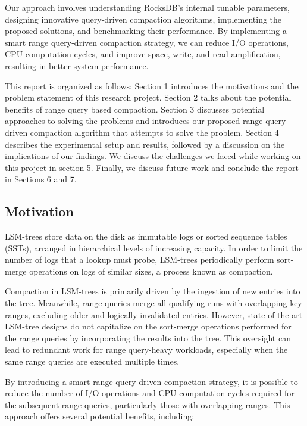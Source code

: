 \documentclass[balance=false, sigconf]{acmart}
\begin{document}
Our approach involves understanding RocksDB's\cite{rocksdb} internal tunable parameters, designing innovative query-driven compaction algorithms, implementing the proposed solutions, and benchmarking their performance. By implementing a smart range query-driven compaction strategy, we can reduce I/O operations, CPU computation cycles, and improve space, write, and read amplification, resulting in better system performance.

This report is organized as follows: Section 1 introduces the motivations and the problem statement of this research project. Section 2 talks about the potential benefits of range query based compaction. Section 3 discusses potential approaches to solving the problems and introduces our proposed range query-driven compaction algorithm that attempts to solve the problem. Section 4 describes the experimental setup and results, followed by a discussion on the implications of our findings. We discuss the challenges we faced while working on this project in section 5. Finally, we discuss future work and conclude the report in Sections 6 and 7.


\subsection{Motivation}

LSM-trees store data on the disk as immutable logs or sorted sequence tables (SSTs), 
arranged in hierarchical levels of increasing capacity. In order to limit the number 
of logs that a lookup must probe, LSM-trees periodically perform sort-merge operations 
on logs of similar sizes, a process known as compaction.

Compaction in LSM-trees is primarily driven by the ingestion of new entries into the 
tree. Meanwhile, range queries merge all qualifying runs with overlapping key ranges, 
excluding older and logically invalidated entries. However, state-of-the-art 
LSM-tree designs do not capitalize on the sort-merge operations performed for the range 
queries by incorporating the results into the tree. This oversight can lead to 
redundant work for range query-heavy workloads, especially when the same range queries are 
executed multiple times.

By introducing a smart range query-driven compaction strategy, it is possible to reduce 
the number of I/O operations and CPU computation cycles required for the subsequent range 
queries, particularly those with overlapping ranges. This approach offers several 
potential benefits, including:
\end{document}
